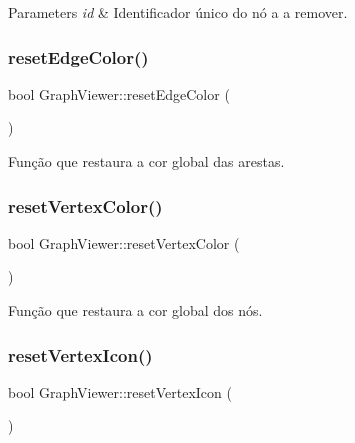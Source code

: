 \begin{DoxyParams}{Parameters}
{\em id} & Identificador único do nó a a remover. \\
\hline
\end{DoxyParams}
\mbox{\label{class_graph_viewer_a1df1a30f4668bf70364fac232f8d0600}} 
\subsubsection{\texorpdfstring{reset\+Edge\+Color()}{resetEdgeColor()}}
{\footnotesize\ttfamily bool Graph\+Viewer\+::reset\+Edge\+Color (\begin{DoxyParamCaption}{ }\end{DoxyParamCaption})}

Função que restaura a cor global das arestas. \mbox{\label{class_graph_viewer_acd95eee309d5e9b1935ec39c5ed45cac}} 
\subsubsection{\texorpdfstring{reset\+Vertex\+Color()}{resetVertexColor()}}
{\footnotesize\ttfamily bool Graph\+Viewer\+::reset\+Vertex\+Color (\begin{DoxyParamCaption}{ }\end{DoxyParamCaption})}

Função que restaura a cor global dos nós. \mbox{\label{class_graph_viewer_ae2b602cfdfb49ec0a67f2bcd11b0fbdb}} 
\subsubsection{\texorpdfstring{reset\+Vertex\+Icon()}{resetVertexIcon()}}
{\footnotesize\ttfamily bool Graph\+Viewer\+::reset\+Vertex\+Icon (\begin{DoxyParamCaption}{ }\end{DoxyParamCaption})}

